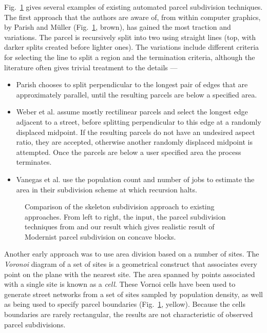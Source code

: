 Fig.~\ref{fig:weregreat} gives several examples of existing automated parcel subdivision techniques. The first approach that the authors are aware of, from within computer graphics, by Parish and M\"{u}ller\cite{Parish:2001:PMC} (Fig.~\ref{fig:weregreat}, brown), has gained the most traction and variations. The parcel is recursively split into two using straight lines (top, with darker splits created before lighter ones). The variations include different criteria for selecting the line to split a region and the termination criteria, although the literature often gives trivial treatment to the details ---
\begin{itemize}
\item Parish chooses to split perpendicular to the longest pair of edges that are approximately parallel, until the resulting parcels are below a specified area.
\item Weber\cite{Weber09} et al. assume mostly rectilinear parcels and select the longest edge adjacent to a street, before splitting perpendicular to this edge at a randomly displaced midpoint. If the resulting parcels do not have an undesired aspect ratio, they are accepted, otherwise another randomly displaced midpoint is attempted. Once the parcels are below a user specified area the process terminates.
\item Vanegas et al.\cite{Vanegas09:IDU} use the population count and number of jobs to estimate the area in their subdivision scheme at which recursion halts.
\end{itemize}

\begin{figure}
\centering
\def\svgwidth{1.\columnwidth}

\caption[Previous parcel generation approaches]{\label{fig:weregreat}Comparison of the skeleton subdivision approach to existing approaches. From left to right, the input, the parcel subdivision techniques from \cite{Parish:2001:PMC,twak06,Aliaga08,Wickramasuriya11} and our result which gives realistic result of Modernist parcel subdivision on concave blocks.}
\end{figure}

Another early approach was to use area division based on a number of sites. The \emph{Voronoi}\cite{Voronoi} diagram of a set of sites is a geometrical construct that associates every point on the plane with the nearest site. The area spanned by points associated with a single site is known as a \emph{cell}. These Vornoi cells have been used to generate street networks from a set of sites sampled by population density\cite{Sun2002}, as well as being used to specify parcel boundaries\cite{twak06} (Fig.~\ref{fig:weregreat}, yellow). Because the cells boundaries are rarely rectangular, the results are not characteristic of observed parcel subdivisions.

